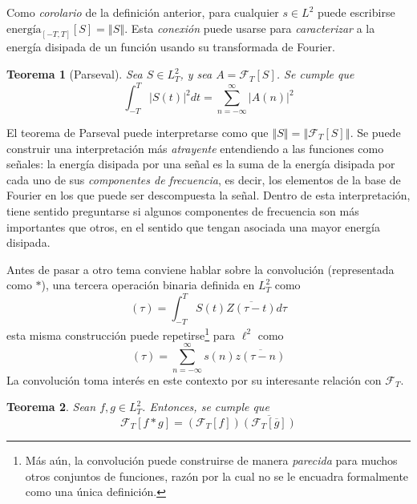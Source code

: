 \documentclass[12pt,letterpaper]{book}
\newtheorem{teorema}{Teorema}[chapter]
\newcommand{\abso}[1]{\left| #1 \right|}
\newcommand{\norma}[1]{\left\Vert #1 \right\Vert}
\begin{document}
Como \textit{corolario} de la definición anterior, para cualquier $s\in L^{2}$ puede escribirse $\text{energía}_{[-T,T]}[S] = \norma{S}$.
%
Esta \textit{conexión} puede usarse para \textit{caracterizar} a la energía disipada de un función usando su transformada de Fourier.

\begin{teorema}[Parseval]
Sea $S \in L^{2}_T$, y sea $A = \mathcal{F}_T[S]$. Se cumple que
\begin{equation*}
\int_{-T}^{T} \abso{S(t)}^{2} dt = \sum_{n=-\infty}^{\infty} \abso{A(n)}^{2}
\end{equation*}
\label{parseval}
\end{teorema}

El teorema de Parseval puede interpretarse como que $\norma{S} = \norma{\mathcal{F}_T[S]}$.
%
Se puede construir una interpretación más \textit{atrayente} entendiendo a las funciones como señales:
la energía disipada por una señal es la suma de la energía disipada por cada uno de sus \textit{componentes de frecuencia}, es decir, los elementos de la base de Fourier en los que puede ser descompuesta la señal.
%
Dentro de esta interpretación, tiene sentido preguntarse si algunos componentes de frecuencia son más importantes que otros, en el sentido que tengan asociada una mayor energía disipada.

Antes de pasar a otro tema conviene hablar sobre la convolución (representada como $\ast$), una tercera operación binaria definida en $L^{2}_T$ como
\begin{equation}
[S \ast Z] (\tau) = \int_{-T}^{T} S(t) \overline{Z(\tau-t)} d\tau
\end{equation}
esta misma construcción puede repetirse\footnote{Más aún, la convolución puede construirse de manera \textit{parecida} para muchos otros conjuntos de funciones, razón por la cual no se le encuadra formalmente como una única definición.} para $\ell^{2}$ como
\begin{equation}
[s \ast z] (\tau) = \sum_{n=-\infty}^{\infty} s(n) \overline{z(\tau-n)}
\end{equation}
La convolución toma interés en este contexto por su interesante relación con $\mathcal{F}_T$.

\begin{teorema}
Sean $f, g \in L^{2}_T$. Entonces, se cumple que
\begin{equation}
\mathcal{F}_T[f \ast g] = \left( \mathcal{F}_T[f] \right) \overline{\left( \mathcal{F}_T[\overline{g}] \right)}
\end{equation}
\end{teorema}
\end{document}
